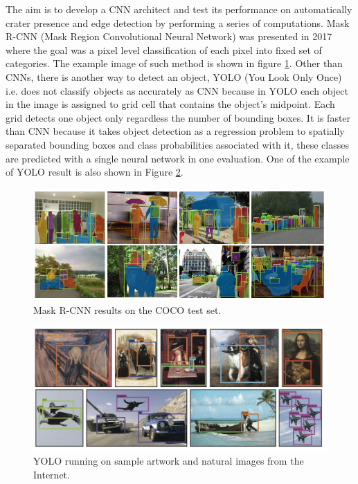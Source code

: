 \documentclass[11pt]{article}
\begin{document}
The aim is to develop a CNN architect and test its performance on automatically crater presence and edge detection by performing a series of computations. Mask R-CNN (Mask Region Convolutional Neural Network) was presented in 2017 where the goal was a pixel level classification of each pixel into fixed set of categories. The example image of such method is shown in figure \ref{fig:Mask R-CNN results on the COCO test set.}. Other than CNNs, there is another way to detect an object, YOLO (You Look Only Once) i.e. does not classify objects as accurately as CNN because in YOLO each object in the image is assigned to grid cell that contains the object's midpoint. Each grid detects one object only regardless the number of bounding boxes. It is faster than CNN because it takes object detection as a regression problem to spatially separated bounding boxes and class probabilities associated with it, these classes are predicted with a single neural network in one evaluation. One of the example of YOLO result is also shown in Figure  \ref{fig:YOLO running on sample artwork and natural images from the internet.}.

\begin{figure}[H]
	\includegraphics[width=\linewidth]{files/mask_R-CNN/results.jpg}
	\caption{Mask R-CNN results on the COCO test set.}
	\label{fig:Mask R-CNN results on the COCO test set.}
\end{figure} 

\begin{figure}[H]
	\includegraphics[width=\linewidth]{files/yolo/results.jpg}
	\caption{YOLO running on sample artwork and natural images from the Internet.}
	\label{fig:YOLO running on sample artwork and natural images from the internet.}
\end{figure}
\end{document}

